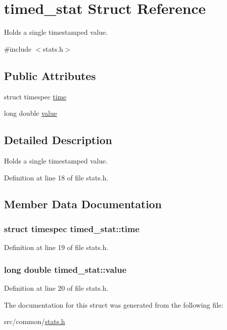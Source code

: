 \hypertarget{structtimed__stat}{\section{timed\-\_\-stat Struct Reference}
\label{structtimed__stat}
}


Holds a single timestamped value.  




{\ttfamily \#include $<$stats.\-h$>$}

\subsection*{Public Attributes}
\begin{DoxyCompactItemize}
\item 
struct timespec \hyperlink{structtimed__stat_a3a88c0e270956c54a1017512206a25e0}{time}
\item 
long double \hyperlink{structtimed__stat_a8b13393299e896ec17e28f696ac99631}{value}
\end{DoxyCompactItemize}


\subsection{Detailed Description}
Holds a single timestamped value. 

Definition at line 18 of file stats.\-h.



\subsection{Member Data Documentation}
\hypertarget{structtimed__stat_a3a88c0e270956c54a1017512206a25e0}{
\subsubsection[{time}]{\setlength{\rightskip}{0pt plus 5cm}struct timespec timed\-\_\-stat\-::time}}\label{structtimed__stat_a3a88c0e270956c54a1017512206a25e0}


Definition at line 19 of file stats.\-h.

\hypertarget{structtimed__stat_a8b13393299e896ec17e28f696ac99631}{
\subsubsection[{value}]{\setlength{\rightskip}{0pt plus 5cm}long double timed\-\_\-stat\-::value}}\label{structtimed__stat_a8b13393299e896ec17e28f696ac99631}


Definition at line 20 of file stats.\-h.



The documentation for this struct was generated from the following file\-:\begin{DoxyCompactItemize}
\item 
src/common/\hyperlink{stats_8h}{stats.\-h}\end{DoxyCompactItemize}
